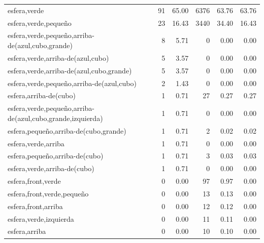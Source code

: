 \begin{table}
\begin{small}
\begin{center}
\begin{tabular}{|l|r|r|r|r|r|}
esfera,verde                                    & 91 & 65.00 & 6376 & 63.76 & 63.76 \\
esfera,verde,peque\~no                              & 23 & 16.43 & 3440 & 34.40 & 16.43 \\
esfera,verde,peque\~no,arriba-de(azul,cubo,grande)      &  8 &  5.71 &    0 &  0.00 &  0.00\\
esfera,verde,arriba-de(azul,cubo)                  &  5 &  3.57 &    0 &  0.00 &  0.00\\
esfera,verde,arriba-de(azul,cubo,grande)            &  5 &  3.57 &    0 &  0.00 &  0.00\\
esfera,verde,peque\~no,arriba-de(azul,cubo)            &  2 &  1.43 &    0 &  0.00 &  0.00\\
esfera,arriba-de(cubo)                             &  1 &  0.71 &   27 &  0.27 &  0.27 \\
esfera,verde,peque\~no,arriba-de(azul,cubo,grande,izquierda) &  1 &  0.71 &    0 &  0.00 &  0.00\\
esfera,peque\~no,arriba-de(cubo,grande)	              &  1 &  0.71 &    2 &  0.02 &  0.02 \\
esfera,verde,arriba                                &  1 &  0.71 &    0 &  0.00 &  0.00\\
esfera,peque\~no,arriba-de(cubo)                       &  1 &  0.71 &    3 &  0.03 &  0.03 \\
esfera,verde,arriba-de(cubo)                       &  1 &  0.71 &    0 &  0.00 &  0.00\\
esfera,front,verde                              &  0 &  0.00 &   97 &  0.97 &  0.00\\
esfera,front,verde,peque\~no                        &  0 &  0.00 &   13 &  0.13 &  0.00\\
esfera,front,arriba                                &  0 &  0.00 &   12 &  0.12 &  0.00\\
esfera,verde,izquierda	                              &  0 &  0.00 &   11 &  0.11 &  0.00\\
esfera,arriba                                      &  0 &  0.00 &   10 &  0.10 &  0.00\\

\end{tabular}
\end{center}
\end{small}
\end{table}
